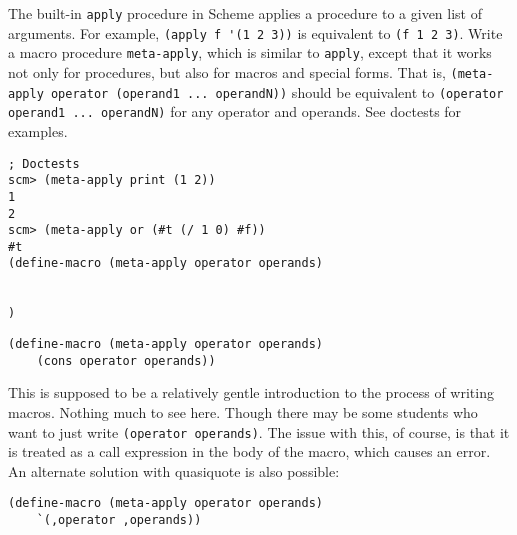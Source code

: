 \begin{blocksection}
\question The built-in \lstinline{apply} procedure in Scheme applies a procedure to a given list of arguments. For example, \lstinline{(apply f '(1 2 3))} is equivalent to \lstinline{(f 1 2 3)}. Write a macro procedure \lstinline{meta-apply}, which is similar to \lstinline{apply}, except that it works not only for procedures, but also for macros and special forms. That is, \lstinline{(meta-apply operator (operand1 ... operandN))} should be equivalent to \lstinline{(operator operand1 ... operandN)} for any operator and operands. See doctests for examples. 

\begin{lstlisting}
; Doctests
scm> (meta-apply print (1 2)) 
1
2
scm> (meta-apply or (#t (/ 1 0) #f))
#t
(define-macro (meta-apply operator operands)
    

)
\end{lstlisting}

\begin{solution}
\begin{lstlisting}
(define-macro (meta-apply operator operands)
    (cons operator operands))
\end{lstlisting}
\end{solution}
\end{blocksection}

\begin{questionmeta}
This is supposed to be a relatively gentle introduction to the process of writing macros. Nothing much to see here. Though there may be some students who want to just write \lstinline{(operator operands)}. The issue with this, of course, is that it is treated as a call expression in the body of the macro, which causes an error. An alternate solution with quasiquote is also possible: 
\begin{lstlisting}
(define-macro (meta-apply operator operands)
    `(,operator ,operands))
\end{lstlisting}
\end{questionmeta}